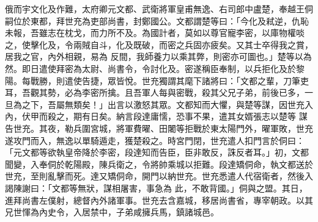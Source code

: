 \begin{pinyinscope}
 俄而宇文化及作難，太府卿元文都、武衛將軍皇甫無逸、右司郎中盧楚，奉越王侗嗣位於東都，拜世充為吏部尚書，封鄭國公。文都謂楚等曰：「今化及弒逆，仇恥未報，吾雖志在枕戈，而力所不及。為國計者，莫如以尊官寵李密，以庫物權啖之，使擊化及，令兩賊自斗，化及既破，而密之兵固亦疲矣。又其士卒得我之賞，居我之官，內外相親，易為
 反間，我師養力以乘其弊，則密亦可圖也。」楚等以為然。即日遣使拜密為太尉、尚書令，令討化及。密遂稱臣奉制，以兵拒化及於黎陽。每戰勝，則遣使告捷，眾皆悅。世充獨謂其麾下諸將曰：「文都之輩，刀筆吏耳，吾觀其勢，必為李密所擒。且吾軍人每與密戰，殺其父兄子弟，前後已多，一旦為之下，吾屬無類矣！」出言以激怒其眾。文都知而大懼，與楚等謀，因世充入內，伏甲而殺之，期有日矣。納言段達庸懦，恐事不果，遣其女婿張志以楚等
 謀告世充。其夜，勒兵圍宮城，將軍費曜、田闍等拒戰於東太陽門外，曜軍敗，世充遂攻門而入，無逸以單騎遁走，獲楚殺之。時宮門閉，世充遣人扣門言於侗曰：「元文都等欲執皇帝降於李密，段達知而告臣，臣非敢反，誅反者耳。」初，文都聞變，入奉侗於乾陽殿，陳兵衛之，令將帥乘城以拒難。段達矯侗命，執文都送於世充，至則亂擊而死。達又矯侗命，開門以納世充。世充悉遣人代宿衛者，然後入謁陳謝曰：「文都等無狀，謀相屠害，事急為
 此，不敢背國。」侗與之盟。其日，進拜尚書左僕射，總督內外諸軍事。世充去含嘉城，移居尚書省，專宰朝政。以其兄世惲為內史令，入居禁中，子弟咸擁兵馬，鎮諸城邑。




\end{pinyinscope}
